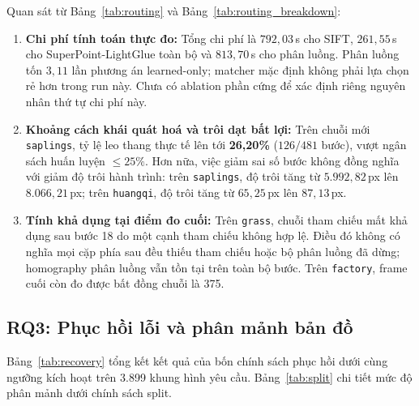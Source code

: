 \documentclass[conference]{IEEEtran}
\begin{document}
Quan sát từ Bảng~\ref{tab:routing} và Bảng~\ref{tab:routing_breakdown}:
\begin{enumerate}
    \item \textbf{Chi phí tính toán thực đo:} Tổng chi phí là $792{,}03$\,s cho SIFT, $261{,}55$\,s cho SuperPoint-LightGlue toàn bộ và $813{,}70$\,s cho phân luồng. Phân luồng tốn $3{,}11$ lần phương án learned-only; matcher mặc định không phải lựa chọn rẻ hơn trong run này. Chưa có ablation phần cứng để xác định riêng nguyên nhân thứ tự chi phí này.
    \item \textbf{Khoảng cách khái quát hoá và trôi dạt bất lợi:} Trên chuỗi mới \texttt{saplings}, tỷ lệ leo thang thực tế lên tới \textbf{26,20\%} ($126/481$ bước), vượt ngân sách huấn luyện $\le 25\%$. Hơn nữa, việc giảm sai số bước không đồng nghĩa với giảm độ trôi hành trình: trên \texttt{saplings}, độ trôi tăng từ $5.992{,}82$\,px lên $8.066{,}21$\,px; trên \texttt{huangqi}, độ trôi tăng từ $65{,}25$\,px lên $87{,}13$\,px.
    \item \textbf{Tính khả dụng tại điểm đo cuối:} Trên \texttt{grass}, chuỗi tham chiếu mất khả dụng sau bước 18 do một cạnh tham chiếu không hợp lệ. Điều đó không có nghĩa mọi cặp phía sau đều thiếu tham chiếu hoặc bộ phân luồng đã dừng; homography phân luồng vẫn tồn tại trên toàn bộ bước. Trên \texttt{factory}, frame cuối còn đo được bất đồng chuỗi là 375.
\end{enumerate}

\subsection{RQ3: Phục hồi lỗi và phân mảnh bản đồ}
\label{subsec:rq3_results}

Bảng~\ref{tab:recovery} tổng kết kết quả của bốn chính sách phục hồi dưới cùng ngưỡng kích hoạt trên 3.899 khung hình yêu cầu. Bảng~\ref{tab:split} chi tiết mức độ phân mảnh dưới chính sách split.

\begin{table}[h]
\centering
\caption{Hiệu năng phục hồi lỗi hạ nguồn (3.899 frame)}
\label{tab:recovery}
\footnotesize

\end{table}

\begin{table}[b]
\centering
\caption{Chi tiết phân mảnh dưới chính sách Split}
\label{tab:split}
\footnotesize

\end{table}
\end{document}
